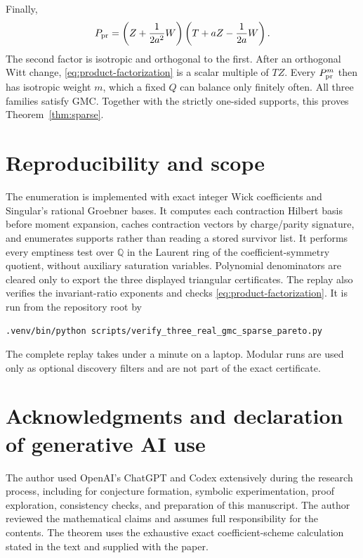 \documentclass[11pt]{article}
\begin{document}
Finally,
\begin{equation}\label{eq:product-factorization}
 P_{\rm pr}
 =
 \left(Z+\frac1{2a^2}W\right)
 \left(T+aZ-\frac1{2a}W\right).
\end{equation}
The second factor is isotropic and orthogonal to the first.  After an
orthogonal Witt change, \eqref{eq:product-factorization} is a scalar
multiple of \(TZ\).  Every \(P_{\rm pr}^m\) then has isotropic weight \(m\),
which a fixed \(Q\) can balance only finitely often.  All three families
satisfy GMC.  Together with the strictly one-sided supports, this proves
Theorem~\ref{thm:sparse}.

\section{Reproducibility and scope}

The enumeration is implemented with exact integer Wick coefficients and
Singular's rational Groebner bases.  It computes each contraction Hilbert
basis before moment expansion, caches contraction vectors by charge/parity
signature, and enumerates supports rather than reading a stored survivor
list.  It performs every emptiness test over \(\mathbb Q\) in the Laurent
ring of the coefficient-symmetry quotient, without auxiliary saturation
variables.  Polynomial denominators are cleared only to export the three
displayed triangular certificates.  The replay also verifies the
invariant-ratio exponents and checks \eqref{eq:product-factorization}.  It
is run from the repository root by
\begin{verbatim}
.venv/bin/python scripts/verify_three_real_gmc_sparse_pareto.py
\end{verbatim}
The complete replay takes under a minute on a laptop.  Modular runs are
used only as optional discovery filters and are not part of the exact
certificate.

\section*{Acknowledgments and declaration of generative AI use}

The author used OpenAI's ChatGPT and Codex extensively during the research
process, including for conjecture formation, symbolic experimentation,
proof exploration, consistency checks, and preparation of this manuscript.
The author reviewed the mathematical claims and assumes full responsibility
for the contents.  The theorem uses the exhaustive exact coefficient-scheme
calculation stated in the text and supplied with the paper.



\end{document}

